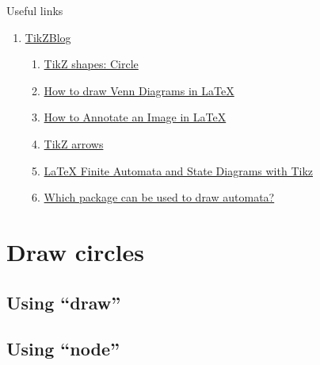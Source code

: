 \documentclass[12pt, letterpaper, oneside]{article}
\begin{document}
Useful links
\begin{enumerate}
  \item \href{https://latexdraw.com/}{TikZBlog}
        \begin{enumerate}
          \item \href{https://latexdraw.com/tikz-shapes-circle/}{TikZ shapes: Circle}
          \item \href{https://latexdraw.com/how-to-draw-venn-diagrams-in-latex/}{How to draw Venn Diagrams in LaTeX}
          \item \href{https://latexdraw.com/how-to-annotate-an-image-in-latex/}{How to Annotate an Image in LaTeX}
          \item \href{https://latexdraw.com/exploring-tikz-arrows/}{TikZ arrows}
          \item \href{https://hayesall.com/blog/latex-automata/}{LaTeX Finite Automata and State Diagrams with Tikz}
          \item \href{https://tex.stackexchange.com/a/20786/66282}{Which package can be used to draw automata?}
        \end{enumerate}
\end{enumerate}

\section{Draw circles}

\subsection{Using ``draw''}


\subsection{Using ``node''}
\end{document}
